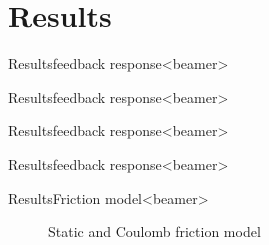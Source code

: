 \section{Results}
\begin{frame}{Results}{feedback response}<beamer>

\begin{figure}
\centering

\end{figure}
\end{frame}

\begin{frame}{Results}{feedback response}<beamer>

\begin{figure}
\centering

\end{figure}
\end{frame}

\begin{frame}{Results}{feedback response}<beamer>

\begin{figure}
\centering

\end{figure}
\end{frame}

\begin{frame}{Results}{feedback response}<beamer>

\begin{figure}
\centering

\end{figure}
\end{frame}

\begin{frame}{Results}{Friction model}<beamer>

\begin{figure}[h]
\centering
\caption{Static and Coulomb friction model}
\label{fig:new_friction_model}
\end{figure}
\end{frame}


